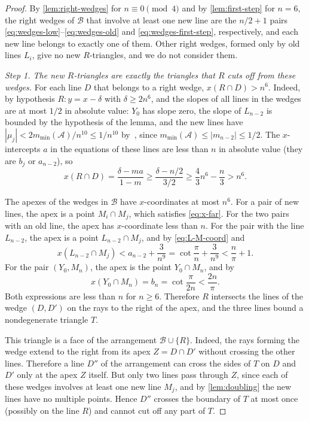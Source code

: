 \begin{proof}
By \cref{lem:right-wedges} for $n\equiv0\pmod4$ and by \cref{lem:first-step} for $n=6$, the right wedges of $\mathcal B$ that involve at least one new line are the $n/2+1$ pairs \eqref{eq:wedges-low}--\eqref{eq:wedges-old} and \eqref{eq:wedges-first-step}, respectively, and each new line belongs to exactly one of them.
Other right wedges, formed only by old lines $L_i$, give no new $R$-triangles, and we do not consider them.

\emph{Step 1. The new $R$-triangles are exactly the triangles that $R$ cuts off from these wedges.} For each line $D$ that belongs to a right wedge,
$x(R\cap D)>n^6$.
Indeed, by hypothesis $R:y=x-\delta$ with $\delta\ge 2n^6$, and the slopes of all lines in the wedges are at most $1/2$ in absolute value: $Y_0$ has slope zero, the slope of $L_{n-2}$ is bounded by the hypothesis of the lemma, and the new lines have $|\mu_j|<2m_{\min}(\mathcal A)/n^{10}\le 1/n^{10}$ by~\cite[(3)]{bbl}, since $m_{\min}(\mathcal A)\le|m_{n-2}|\le1/2$.
The $x$-intercepts $a$ in the equations of these lines are less than $n$ in absolute value (they are $b_j$ or $a_{n-2}$), so
\[
x(R\cap D)=\frac{\delta-ma}{1-m}\ge\frac{\delta-n/2}{3/2}\ge\frac43n^6-\frac n3>n^6 .
\]

The apexes of the wedges in $\mathcal{B}$ have $x$-coordinates at most $n^6$. For a pair of new lines, the apex is a point $M_i\cap M_j$, which satisfies \eqref{eq:x-far}. For the two pairs with an old line, the apex has $x$-coordinate less than $n$.
For the pair with the line $L_{n-2}$, the apex is a point $L_{n-2}\cap M_j$, and by \eqref{eq:L-M-coord} and~\cite[(4)]{bbl}
\[
x(L_{n-2}\cap M_j)<a_{n-2}+\frac3{n^9}=\cot\frac\pi n+\frac3{n^9}<\frac n\pi+1 .
\]
For the pair $(Y_0,M_n)$, the apex is the point $Y_0\cap M_n$, and by~\cite[(3)]{bbl}
\[
x(Y_0\cap M_n)=b_n=\cot\frac\pi{2n}<\frac{2n}\pi .
\]
Both expressions are less than $n$ for $n\ge6$. Therefore $R$ intersects the lines of the wedge $(D,D')$ on the rays to the right of the apex, and the three lines bound a nondegenerate triangle $T$.

This triangle is a face of the arrangement $\mathcal{B}\cup \{R\}$.
Indeed, the rays forming the wedge extend to the right from its apex $Z=D\cap D'$ without crossing the other lines.
Therefore a line $D''$ of the arrangement can cross the sides of $T$ on $D$ and $D'$ only at the apex $Z$ itself.
But only two lines pass through $Z$, since each of these wedges involves at least one new line $M_j$, and by \cref{lem:doubling} the new lines have no multiple points.
Hence $D''$ crosses the boundary of $T$ at most once (possibly on the line $R$) and cannot cut off any part of $T$.


\end{proof}
